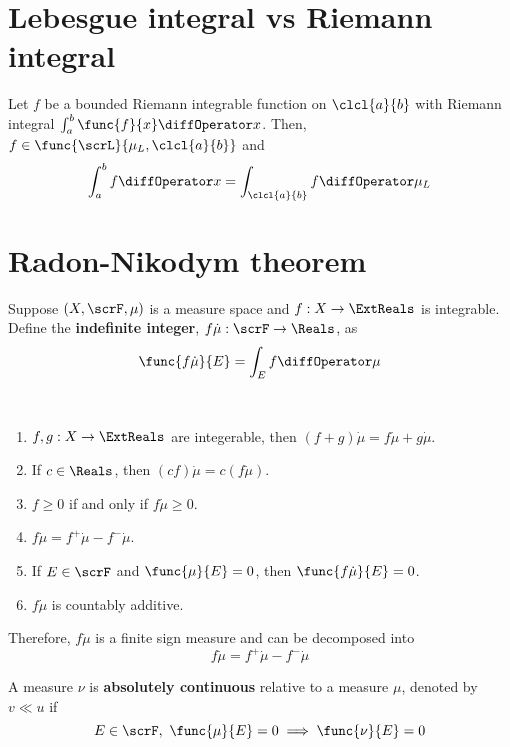 \section{Lebesgue integral vs Riemann integral}
\begin{theorem}
    Let \(f\) be a bounded Riemann integrable function on \(\clcl{a}{b}\) with Riemann integral \(\int_a^b \func{f}{x} \diffOperator x\). Then, \(f \in \func{\scrL}{\mu_L,\clcl{a}{b}}\) and 
    \begin{equation*}
        \int_a^b f \diffOperator x = \int_{\clcl{a}{b}} f \diffOperator \mu_L
    \end{equation*}
\end{theorem}

\section{Radon-Nikodym theorem}
Suppose \((X,\scrF,\mu)\) is a measure space and \(f:X \to \ExtReals\) is integrable. Define the \textbf{indefinite integer}, \(f\dot \mu:\scrF \to \Reals\), as 
\begin{equation*}
    \func{f \dot \mu}{E} = \int_E f \diffOperator\mu 
\end{equation*}

\begin{proposition}
    \ 
    \begin{enumerate}
        \item \(f,g : X \to \ExtReals\) are integerable, then \((f + g)\dot \mu = f\dot \mu + g \dot \mu\).
        \item If \(c \in \Reals\), then \((cf) \dot \mu = c(f\dot \mu)\).
        \item \(f \geq 0\) if and only if \(f \dot \mu \geq 0\).
        \item \(f \dot \mu = f^+ \dot \mu - f^- \dot \mu\).
        \item If \(E \in \scrF\) and \(\func{\mu}{E} = 0\), then \(\func{f \dot \mu}{E} = 0\).
        \item \(f \dot \mu\) is countably additive.
    \end{enumerate}
    Therefore, \(f \dot \mu\) is a finite sign measure and can be decomposed into 
    \begin{equation*}
        f \dot \mu = f^{+}\dot \mu - f^{-} \dot \mu
    \end{equation*}
\end{proposition}

\begin{definition}
    A measure \(\nu\) is \textbf{absolutely continuous} relative to a measure \(\mu\), denoted by \(v \ll u\) if 
    \begin{equation*}
        E \in \scrF, \ \func{\mu}{E} = 0 \implies \func{\nu}{E} = 0
    \end{equation*}
\end{definition}

